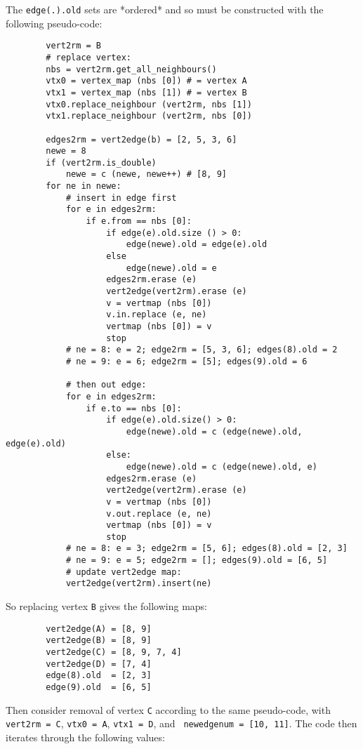     The {\tt edge(.).old} sets are *ordered* and so must be constructed with the following pseudo-code:
    \begin{lstlisting}
        vert2rm = B
        # replace vertex:
        nbs = vert2rm.get_all_neighbours()
        vtx0 = vertex_map (nbs [0]) # = vertex A
        vtx1 = vertex_map (nbs [1]) # = vertex B
        vtx0.replace_neighbour (vert2rm, nbs [1])
        vtx1.replace_neighbour (vert2rm, nbs [0])

        edges2rm = vert2edge(b) = [2, 5, 3, 6]
        newe = 8
        if (vert2rm.is_double)
            newe = c (newe, newe++) # [8, 9]
        for ne in newe:
            # insert in edge first
            for e in edges2rm:
                if e.from == nbs [0]:
                    if edge(e).old.size () > 0:
                        edge(newe).old = edge(e).old
                    else
                        edge(newe).old = e
                    edges2rm.erase (e)
                    vert2edge(vert2rm).erase (e)
                    v = vertmap (nbs [0])
                    v.in.replace (e, ne)
                    vertmap (nbs [0]) = v
                    stop
            # ne = 8: e = 2; edge2rm = [5, 3, 6]; edges(8).old = 2
            # ne = 9: e = 6; edge2rm = [5]; edges(9).old = 6

            # then out edge:
            for e in edges2rm:
                if e.to == nbs [0]:
                    if edge(e).old.size() > 0:
                        edge(newe).old = c (edge(newe).old, edge(e).old)
                    else:
                        edge(newe).old = c (edge(newe).old, e)
                    edges2rm.erase (e)
                    vert2edge(vert2rm).erase (e)
                    v = vertmap (nbs [0])
                    v.out.replace (e, ne)
                    vertmap (nbs [0]) = v
                    stop
            # ne = 8: e = 3; edge2rm = [5, 6]; edges(8).old = [2, 3]
            # ne = 9: e = 5; edge2rm = []; edges(9).old = [6, 5]
            # update vert2edge map:
            vert2edge(vert2rm).insert(ne)
    \end{lstlisting}
    So replacing vertex {\tt B} gives the following maps:
    \begin{lstlisting}
        vert2edge(A) = [8, 9]
        vert2edge(B) = [8, 9]
        vert2edge(C) = [8, 9, 7, 4]
        vert2edge(D) = [7, 4]
        edge(8).old  = [2, 3]
        edge(9).old  = [6, 5]
    \end{lstlisting}
    Then consider removal of vertex {\tt C} according to the same pseudo-code, with {\tt vert2rm = C}, {\tt vtx0 = A}, {\tt vtx1 = D}, and {\tt
    newedgenum = [10, 11]}. The code then iterates through the following values:
